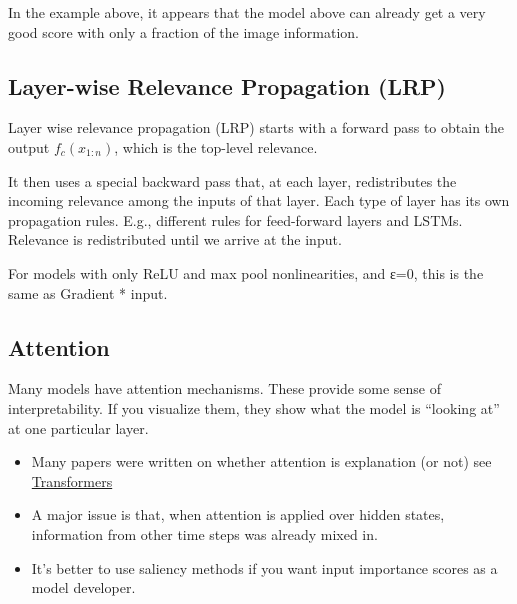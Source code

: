 \documentclass[
  11pt,
  british,
]{article}
\providecommand{\tightlist}{%
  \setlength{\itemsep}{0pt}\setlength{\parskip}{0pt}}
\begin{document}
In the example above, it appears that the model above can already get a
very good score with only a fraction of the image information.

\hypertarget{layer-wise-relevance-propagation-lrp}{%
\subsection{Layer-wise Relevance Propagation
(LRP)}\label{layer-wise-relevance-propagation-lrp}}

Layer wise relevance propagation (LRP) starts with a forward pass to
obtain the output \(f_c(x_{1:n})\), which is the top-level relevance.

It then uses a special backward pass that, at each layer, redistributes
the incoming relevance among the inputs of that layer. Each type of
layer has its own propagation rules. E.g., different rules for
feed-forward layers and LSTMs. Relevance is redistributed until we
arrive at the input.

For models with only ReLU and max pool nonlinearities, and ε=0, this is
the same as Gradient * input.

\hypertarget{attention}{%
\subsection{Attention}\label{attention}}

Many models have attention mechanisms. These provide some sense of
interpretability. If you visualize them, they show what the model is
``looking at'' at one particular layer.

\begin{itemize}
\tightlist
\item
  Many papers were written on whether attention is explanation (or not)
  see \href{Transformers.md}{Transformers}
\item
  A major issue is that, when attention is applied over hidden states,
  information from other time steps was already mixed in.\\
\item
  It's better to use saliency methods if you want input importance
  scores as a model developer.
\end{itemize}
\end{document}
